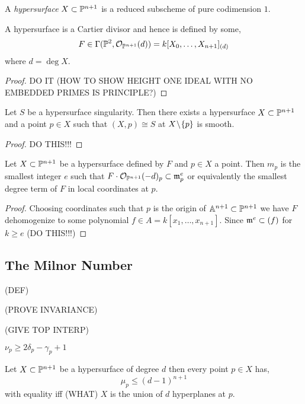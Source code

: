 \documentclass[12pt]{article}
\begin{document}
\begin{defn}
A \textit{hypersurface} $X \subset \P^{n+1}$ is a reduced subscheme of pure codimension $1$.
\end{defn}

\begin{prop}
A hypersurface is a Cartier divisor and hence is defined by some,
\[ F \in \Gamma(\P^2, \struct{\P^{n+1}}(d)) = k[X_0, \dots, X_{n+1}]_{(d)} \]
where $d = \deg{X}$.
\end{prop}

\begin{proof}
DO IT (HOW TO SHOW HEIGHT ONE IDEAL WITH NO EMBEDDED PRIMES IS PRINCIPLE?)
\end{proof}

\begin{prop}
Let $S$ be a hypersurface singularity. Then there exists a hypersurface $X \subset \P^{n+1}$ and a point $p \in X$ such that $(X, p) \cong S$ at $X \sm \{ p \}$ is smooth.
\end{prop}

\begin{proof}
DO THIS!!!
\end{proof}

\begin{prop}
Let $X \subset \P^{n+1}$ be a hypersurface defined by $F$ and $p \in X$ a point. Then $m_p$ is the smallest integer $e$ such that $F \cdot \struct{\P^{n+1}}(-d)_p \subset \m_p^e$ or equivalently the smallest degree term of $F$ in local coordinates at $p$.
\end{prop}

\begin{proof}
Choosing coordinates such that $p$ is the origin of $\A^{n+1} \subset \P^{n+1}$ we have $F$ dehomogenize to some polynomial $f \in A = k[x_1, \dots, x_{n+1}]$. Since $\m^e \subset (f)$ for $k \ge e$ (DO THIS!!!)
\end{proof}

\subsection{The Milnor Number}

(DEF)

(PROVE INVARIANCE)

(GIVE TOP INTERP)

\begin{prop}
$\nu_p \ge 2 \delta_p - \gamma_p + 1$
\end{prop}

\begin{prop}
Let $X \subset \P^{n+1}$ be a hypersurface of degree $d$ then every point $p \in X$ has,
\[ \mu_p \le (d - 1)^{n+1} \]
with equality iff (WHAT) $X$ is the union of $d$ hyperplanes at $p$. 
\end{prop}
\end{document}
